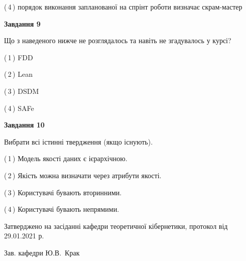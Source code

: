 \documentclass[10pt, ukrainian]{article}
\begin{document}
{\begin {large}
(\,4\,) порядок виконання запланованої на спрінт роботи визначає скрам-мастер%


{\begin {center}\textbf{Завдання 9}\end {center}}\par
Що з наведеного нижче не розглядалось та навіть не згадувалось у курсі?\par
\vspace{2mm}



(\,1\,) FDD%



(\,2\,) Lean%



(\,3\,) DSDM%



(\,4\,) SAFe%


{\begin {center}\textbf{Завдання 10}\end {center}}\par
Вибрати всі істинні твердження (якщо існують).\par
\vspace{2mm}



(\,1\,) Модель якості даних є ієрархічною.%



(\,2\,) Якість можна визначати через атрибути якості.%



(\,3\,) Користувачі бувають вторинними.%



(\,4\,) Користувачі бувають непрямими.%



\end {large}}
{\vspace{5mm}\smallskip \begin {small} Затверджено на засіданні кафедри теоретичної кібернетики, протокол  від   29.01.2021 р.\par\smallskip\smallskip
{\parbox {6.5 cm}{Зав. кафедри \dotfill Ю.В.~Крак}} \end{small}}
\newpage
\end{document}
